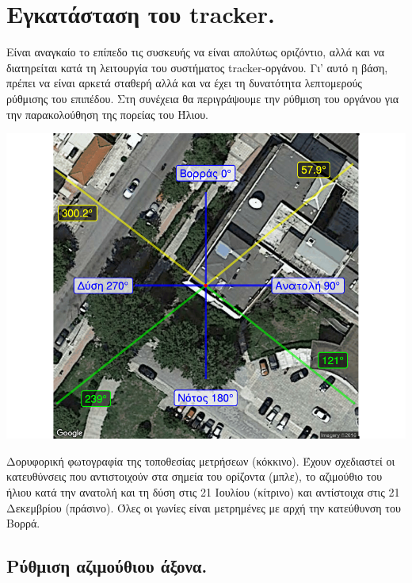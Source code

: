 \documentclass[
  a4paper,
  twoside,
  titlepage,
  11pt]{article}
\numberwithin{equation}{section}
\numberwithin{figure}{section}
\numberwithin{table}{section}
\begin{document}
\newpage

\hypertarget{trackerinstallation}{%
\section{Εγκατάσταση του tracker.}\label{trackerinstallation}}

Είναι αναγκαίο το επίπεδο τις συσκευής να είναι απολύτως οριζόντιο, αλλά και να διατηρείται κατά τη λειτουργία του συστήματος tracker-οργάνου. Γι' αυτό η βάση, πρέπει να είναι αρκετά σταθερή αλλά και να έχει τη δυνατότητα λεπτομερούς ρύθμισης του επιπέδου. Στη συνέχεια θα περιγράψουμε την ρύθμιση του οργάνου για την παρακολούθηση της πορείας του Ήλιου.

\begin{img}

{\centering \includegraphics[width=1\linewidth]{figure/compass} 

}

\caption{Δορυφορική φωτογραφία της τοποθεσίας μετρήσεων (κόκκινο). Έχουν σχεδιαστεί οι κατευθύνσεις που αντιστοιχούν στα σημεία του ορίζοντα (μπλε), το αζιμούθιο του ήλιου κατά την ανατολή και τη δύση στις 21 Ιουλίου (κίτρινο) και αντίστοιχα στις 21 Δεκεμβρίου (πράσινο). Όλες οι γωνίες είναι μετρημένες με αρχή την κατεύθυνση του Βορρά.}\label{fig:trackercompass}
\end{img}

\hypertarget{ux3c1ux3cdux3b8ux3bcux3b9ux3c3ux3b7-ux3b1ux3b6ux3b9ux3bcux3bfux3cdux3b8ux3b9ux3bfux3c5-ux3acux3beux3bfux3bdux3b1.}{%
\subsection{Ρύθμιση αζιμούθιου άξονα.}\label{ux3c1ux3cdux3b8ux3bcux3b9ux3c3ux3b7-ux3b1ux3b6ux3b9ux3bcux3bfux3cdux3b8ux3b9ux3bfux3c5-ux3acux3beux3bfux3bdux3b1.}}
\end{document}

